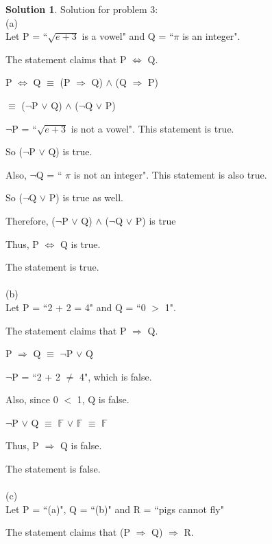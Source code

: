 \documentclass{article}
\theoremstyle{definition}
\newtheorem*{solution}{Solution}
\begin{document}
\begin{solution} Solution for problem 3:\\

(a)\\

Let P = ``\(\sqrt{e+3}\) is a vowel" and Q = ``\(\pi\) is an integer".

The statement claims that P \(\Leftrightarrow\) Q.

 P \(\Leftrightarrow\) Q \(\equiv\) (P \(\Rightarrow\) Q) \(\wedge\) (Q \(\Rightarrow\) P)
 
 \(\equiv\) (\(\neg\)P \(\vee\) Q) \(\wedge\) (\(\neg\)Q \(\vee\) P)
 
 \(\neg\)P = ``\(\sqrt{e+3}\) is not a vowel". This statement is true.
 
 So (\(\neg\)P \(\vee\) Q) is true.
 
 Also, \(\neg\)Q = `` \(\pi\) is not an integer". This statement is also true.
 
 So (\(\neg\)Q \(\vee\) P) is true as well.
 
 Therefore, (\(\neg\)P \(\vee\) Q) \(\wedge\) (\(\neg\)Q \(\vee\) P) is true
 
 Thus, P \(\Leftrightarrow\) Q is true.
 
 The statement is true.\\\\
 
 
 (b)\\
 
 Let P = ``2 + 2 = 4" and Q = ``0 $>$ 1".
 
 The statement claims that P \(\Rightarrow\) Q.
 
 P \(\Rightarrow\) Q \(\equiv\) \(\neg\)P \(\vee\) Q
 
 \(\neg\)P = ``2 + 2 \(\neq\) 4", which is false.
 
 Also, since 0 $<$ 1, Q is false.
 
 \(\neg\)P \(\vee\) Q \(\equiv\) \(\mathbb{F}\) \(\vee\) \(\mathbb{F}\) \(\equiv\) \(\mathbb{F}\)
 
 Thus,  P \(\Rightarrow\) Q is false.
 
 The statement is false.\\\\
 
 (c)\\
 
 Let P = ``(a)", Q = ``(b)" and R = ``pigs cannot fly"
 
 The statement claims that (P \(\Rightarrow\) Q) \(\Rightarrow\) R.
 

\end{solution}
\end{document}

